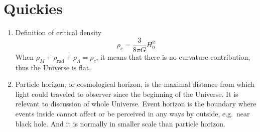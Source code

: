 \section{Quickies}
\begin{enumerate}[label=(\alph*)]
   \item Definition of critical density
      \begin{equation}
         \rho_c = \frac{3 }{8\pi G}H_0^2
      \end{equation}
      When $\rho_{M} + \rho_\text{rad} + \rho_{\Lambda} = \rho_c$, it means that there is no curvature contribution, thus the Universe is flat.
   \item Particle horizon, or cosmological horizon, is the maximal distance from which light could traveled to observer since the beginning of the Universe\cite{wiki:partHor}. It is relevant to discussion of whole Universe. Event horizon is the boundary where events inside cannot affect or be perceived in any ways by outside, e.g.~near black hole. And it is normally in smaller scale than particle horizon.
\end{enumerate}
